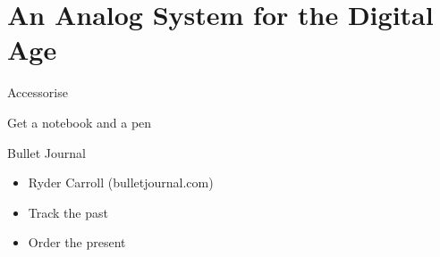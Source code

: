 \documentclass[aspectratio=169]{beamer}
\begin{document}
    \section{An Analog System for the Digital Age}

    {
    \begin{frame}{Accessorise}
        \begin{titlebox}
            \centering
            Get a notebook and a pen
        \end{titlebox}
    \end{frame}
    }

    {
    \begin{frame}{Bullet Journal}
        \begin{itemize}
            \item Ryder Carroll (bulletjournal.com)
            \item \alert{Track the past}
            \item Order the present
        \end{itemize}
    \end{frame}
    }
\end{document}

